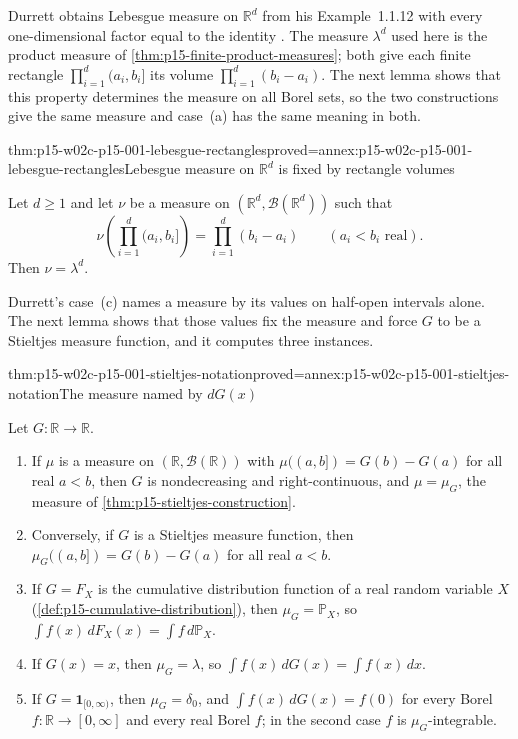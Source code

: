 Durrett obtains Lebesgue measure on \(\mathbb R^d\) from his Example~1.1.12
with every one-dimensional factor equal to the identity
\cite[ex.~1.1.12, p.~8]{DurrettPTEAuthor2019}. The measure \(\lambda^d\)
used here is the product measure of \cref{thm:p15-finite-product-measures};
both give each finite rectangle \(\prod_{i=1}^d(a_i,b_i]\) its volume
\(\prod_{i=1}^d(b_i-a_i)\). The next lemma shows that this property
determines the measure on all Borel sets, so the two constructions give the
same measure and case~(a) has the same meaning in both.

\begin{hblemma}{thm:p15-w02c-p15-001-lebesgue-rectangles}{proved=annex:p15-w02c-p15-001-lebesgue-rectangles}{Lebesgue measure on \(\mathbb R^d\) is fixed by rectangle volumes}
\par\nobreak
Let \(d\geq1\) and let \(\nu\) be a measure on
\((\mathbb R^d,\mathcal B(\mathbb R^d))\) such that
\[
 \nu\left(\prod_{i=1}^d(a_i,b_i]\right)=\prod_{i=1}^d(b_i-a_i)
 \qquad(a_i<b_i\text{ real}).
\]
Then \(\nu=\lambda^d\).
\end{hblemma}

Durrett's case~(c) names a measure by its values on half-open intervals
alone. The next lemma shows that those values fix the measure and force
\(G\) to be a Stieltjes measure function, and it computes three instances.

\begin{hblemma}{thm:p15-w02c-p15-001-stieltjes-notation}{proved=annex:p15-w02c-p15-001-stieltjes-notation}{The measure named by \(dG(x)\)}
\par\nobreak
Let \(G:\mathbb R\to\mathbb R\).
\begin{enumerate}
\item If \(\mu\) is a measure on \((\mathbb R,\mathcal B(\mathbb R))\) with
      \(\mu((a,b])=G(b)-G(a)\) for all real \(a<b\), then \(G\) is
      nondecreasing and right-continuous, and \(\mu=\mu_G\), the measure
      of \cref{thm:p15-stieltjes-construction}.
\item Conversely, if \(G\) is a Stieltjes measure function, then
      \(\mu_G((a,b])=G(b)-G(a)\) for all real \(a<b\).
\item If \(G=F_X\) is the cumulative distribution function of a real
      random variable \(X\) (\cref{def:p15-cumulative-distribution}),
      then \(\mu_G=\mathbb P_X\), so
      \(\int f(x)\,dF_X(x)=\int f\,d\mathbb P_X\).
\item If \(G(x)=x\), then \(\mu_G=\lambda\), so
      \(\int f(x)\,dG(x)=\int f(x)\,dx\).
\item If \(G=\mathbf1_{[0,\infty)}\), then \(\mu_G=\delta_0\), and
      \(\int f(x)\,dG(x)=f(0)\) for every Borel
      \(f:\mathbb R\to[0,\infty]\) and every real Borel \(f\); in the
      second case \(f\) is \(\mu_G\)-integrable.
\end{enumerate}
\end{hblemma}

